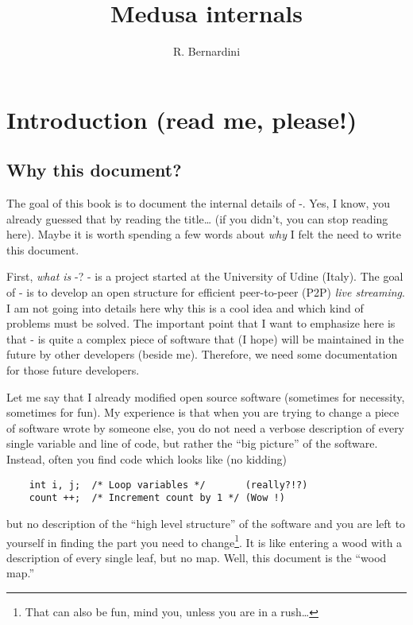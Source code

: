 \documentclass{medusabook}
\title{Medusa internals}
\author{R. Bernardini}
\begin{document}
  \maketitle
\tableofcontents
\chapter{Introduction (read me, please!)}

\section{Why this document?}
\label{sect:0;medusa_book}

The goal of this book is to document the internal details of
\medusa-. Yes, I know, you already guessed that by reading the
title\ldots{} (if you didn't, you can stop reading here).  Maybe it is
worth spending a few words about \emph{why} I felt the need to write
this document.

First, \emph{what is} \medusa-? \medusa- is a project started at the
University of Udine (Italy).  The goal of \medusa- is to develop an
open structure for efficient peer-to-peer (P2P) \emph{live streaming}.
I am not going into details here why this is a cool idea and which
kind of problems must be solved.  The important point that I want to
emphasize here is that \medusa- is quite a complex piece of software
that (I hope) will be maintained in the future by other developers
(beside me).  Therefore, we need some documentation for those future
developers.

Let me say that I already modified open source software (sometimes for
necessity, sometimes for fun).  My experience is that when you are
trying to change a piece of software wrote by someone else, you do not
need a verbose description of every single variable and line of code,
but rather the ``big picture'' of the software.  Instead, often you
find code which looks like (no kidding)

\begin{verbatim}
    int i, j;  /* Loop variables */       (really?!?)
    count ++;  /* Increment count by 1 */ (Wow !)
\end{verbatim}

\noindent
but no description of the ``high level structure'' of the software and
you are left to yourself in finding the part you need to
change\footnote{That can also be fun, mind you, unless you are in a
rush\ldots}.  It is like entering a wood with a description of every
single leaf, but no map.  Well, this document is the ``wood map.''
\end{document}

